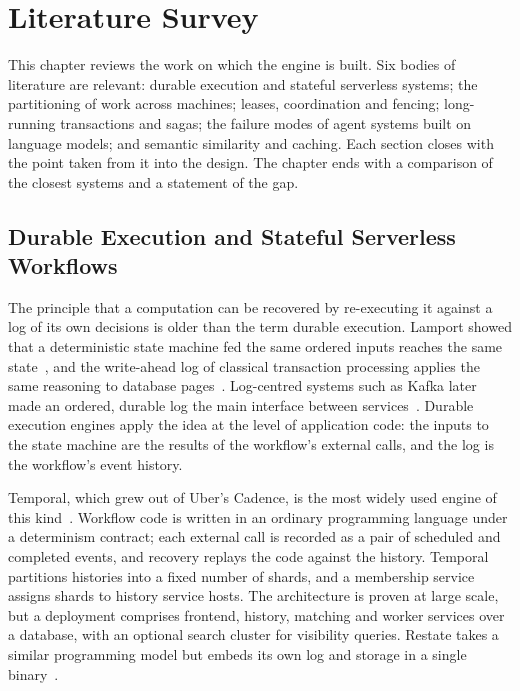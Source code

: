 \clearpage
\chapter{Literature Survey}

This chapter reviews the work on which the engine is built. Six bodies of
literature are relevant: durable execution and stateful serverless systems;
the partitioning of work across machines; leases, coordination and fencing;
long-running transactions and sagas; the failure modes of agent systems built
on language models; and semantic similarity and caching. Each section closes
with the point taken from it into the design. The chapter ends with a
comparison of the closest systems and a statement of the gap.

\section{Durable Execution and Stateful Serverless Workflows}

The principle that a computation can be recovered by re-executing it against
a log of its own decisions is older than the term durable execution. Lamport
showed that a deterministic state machine fed the same ordered inputs reaches
the same state~\cite{lamport1978}, and the write-ahead log of classical
transaction processing applies the same reasoning to database
pages~\cite{grayreuter1992}. Log-centred systems such as Kafka later made an
ordered, durable log the main interface between services~\cite{kafka2011}.
Durable execution engines apply the idea at the level of application code: the
inputs to the state machine are the results of the workflow's external calls,
and the log is the workflow's event history.

Temporal, which grew out of Uber's Cadence, is the most widely used engine of
this kind~\cite{temporaldocs}. Workflow code is written in an ordinary
programming language under a determinism contract; each external call is
recorded as a pair of scheduled and completed events, and recovery replays the
code against the history. Temporal partitions histories into a fixed number of
shards, and a membership service assigns shards to history service hosts. The
architecture is proven at large scale, but a deployment comprises frontend,
history, matching and worker services over a database, with an optional search
cluster for visibility queries. Restate takes a similar programming model but
embeds its own log and storage in a single binary~\cite{restatedocs}.

